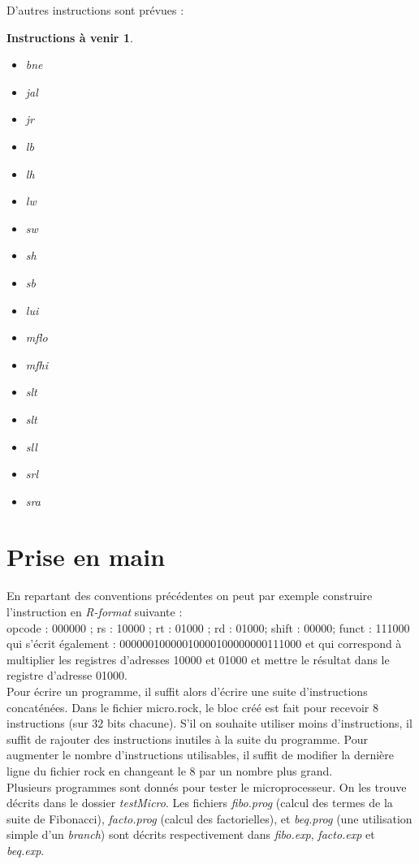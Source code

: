\documentclass[13pt]{article}
\newtheorem{instrFutures}
{ \textbf{Instructions à venir} }
\begin{document}
D'autres instructions sont prévues :

\begin{instrFutures}
\begin{itemize}
\item   bne
\item   jal
\item   jr
\item   lb
\item   lh
\item   lw
\item   sw
\item   sh
\item   sb
\item   lui
\item   mflo
\item   mfhi
\item   slt
\item   slt
\item   sll
\item   srl
\item   sra
\end{itemize}
\end{instrFutures}

\section{Prise en main}

En repartant des conventions précédentes
on peut par exemple construire l'instruction en 
\textit{R-format} suivante : \\
opcode : 000000 ; rs : 10000 ; rt : 01000 ; 
rd : 01000; shift : 00000; funct : 111000\\
qui s'écrit également :
00000010000010000100000000111000
et qui correspond à multiplier les registres d'adresses 10000
et 01000 et mettre le résultat dans le registre d'adresse
01000.\\

Pour écrire un programme, il suffit alors d'écrire une suite
d'instructions concaténées. Dans le fichier micro.rock, le
bloc créé est fait pour recevoir 8 instructions 
(sur 32 bits chacune).
S'il on souhaite utiliser moins d'instructions, il suffit de
rajouter des instructions inutiles à la suite du programme.
Pour augmenter le nombre d'instructions utilisables, il
suffit de modifier la dernière ligne du fichier rock en
changeant le 8 par un nombre plus grand. \\


Plusieurs programmes sont donnés 
pour tester le microprocesseur.
On les trouve décrits dans le dossier \textit{testMicro}.
Les fichiers \textit{fibo.prog} (calcul des termes de la suite
de Fibonacci), \textit{facto.prog} (calcul des factorielles), et 
\textit{beq.prog} (une utilisation simple d'un \textit{branch}) 
sont décrits respectivement dans \textit{fibo.exp}, \textit{facto.exp}
et \textit{beq.exp}.\\
\end{document}

